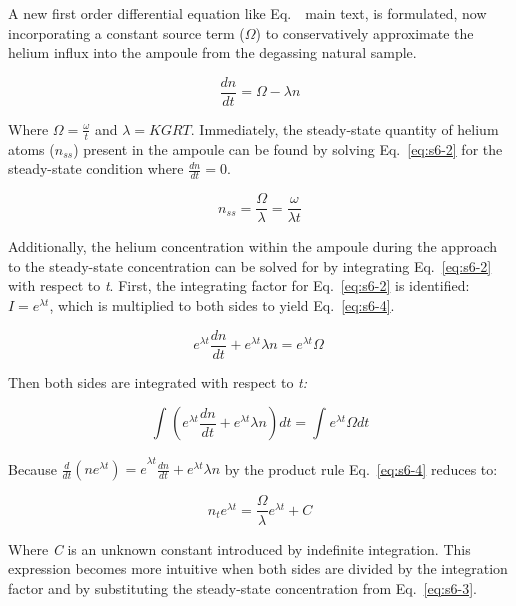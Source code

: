 A new first order differential equation like Eq.~\MainEqPermode\, main text, is formulated, now
incorporating a constant source term (\(\Omega\)) to conservatively
approximate the helium influx into the ampoule from the degassing
natural sample.

\begin{equation}
\frac{dn}{dt} = \Omega - \lambda n
\label{eq:s6-2}
\end{equation}

Where \(\Omega = \frac{\omega}{t}\) and \(\lambda = KGRT\). Immediately,
the steady-state quantity of helium atoms (\(n_{ss}\)) present in the
ampoule can be found by solving Eq.~\eqref{eq:s6-2} for the steady-state condition
where \(\frac{dn}{dt} = 0\).

\begin{equation}
n_{ss} = \frac{\Omega}{\lambda} = \frac{\omega}{\lambda t}
\label{eq:s6-3}
\end{equation}

Additionally, the helium concentration within the ampoule during the
approach to the steady-state concentration can be solved for by
integrating Eq.~\eqref{eq:s6-2} with respect to \emph{t}. First, the integrating
factor for Eq.~\eqref{eq:s6-2} is identified: \(I = e^{\lambda t}\), which is
multiplied to both sides to yield Eq.~\eqref{eq:s6-4}.

\begin{equation}
e^{\lambda t}\frac{dn}{dt} + e^{\lambda t}\lambda n = e^{\lambda t}\Omega\
\label{eq:s6-4}
\end{equation}

Then both sides are integrated with respect to \emph{t:}

\[\int_{}^{}\left( e^{\lambda t}\frac{dn}{dt} + e^{\lambda t}\lambda n \right)dt = \int_{}^{}{e^{\lambda t}\Omega}dt\]

Because
\({\frac{d}{dt}(ne^{\lambda t}) = e}^{\lambda t}\frac{dn}{dt} + e^{\lambda t}\lambda n\)
by the product rule Eq.~\eqref{eq:s6-4} reduces to:

\begin{equation}
n_{t}e^{\lambda t} = \frac{\Omega}{\lambda}e^{\lambda t} + C
\label{eq:s6-5}
\end{equation}

Where \emph{C} is an unknown constant introduced by indefinite
integration. This expression becomes more intuitive when both sides are
divided by the integration factor and by substituting the steady-state
concentration from Eq.~\eqref{eq:s6-3}.

